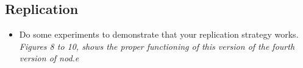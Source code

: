 \subsection{Replication}
\begin{itemize}
\item Do some experiments to demonstrate that your replication strategy works.
\newline \textit{Figures 8 to 10, shows the proper functioning of this version of the fourth version of nod.e}
\end{itemize}
